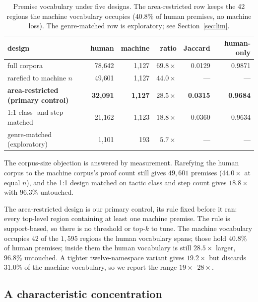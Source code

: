 \documentclass{article}
\begin{document}
\begin{table}[t]
\centering
\small
\begin{tabular}{lrrrrr}
\toprule
design & human & machine & ratio & Jaccard & human-only \\
\midrule
full corpora & 78{,}642 & 1{,}127 & $69.8\times$ & 0.0129 & 0.9871 \\
rarefied to machine $n$ & 49{,}601 & 1{,}127 & $44.0\times$ & --- & --- \\
\textbf{area-restricted (primary control)} & \textbf{32{,}091} & \textbf{1{,}127} & $\mathbf{28.5\times}$ & \textbf{0.0315} & \textbf{0.9684} \\
1:1 class- and step-matched & 21{,}162 & 1{,}123 & $18.8\times$ & 0.0360 & 0.9634 \\
genre-matched (exploratory) & 1{,}101 & 193 & $5.7\times$ & --- & --- \\
\bottomrule
\end{tabular}
\caption{Premise vocabulary under five designs. The area-restricted row keeps
the 42 regions the machine vocabulary occupies ($40.8\%$ of human premises, no
machine loss). The genre-matched row is exploratory; see
Section~\ref{sec:lim}.}
\label{tab:coverage}
\end{table}

The corpus-size objection is answered by measurement. Rarefying the human corpus
to the machine corpus's proof count still gives $49{,}601$ premises
($44.0\times$ at equal $n$), and the 1:1 design matched on tactic class and step
count gives $18.8\times$ with $96.3\%$ untouched.

The area-restricted design is our primary control, its rule fixed before it ran:
every top-level region containing at least one machine premise. The rule is
support-based, so there is no threshold or top-$k$ to tune. The machine vocabulary occupies $42$ of the
$1{,}595$ regions the human vocabulary spans; those hold $40.8\%$ of human
premises; inside them the human vocabulary is still $28.5\times$ larger, $96.8\%$
untouched. A tighter twelve-namespace variant gives $19.2\times$ but discards $31.0\%$ of
the machine vocabulary, so we report the range $19\times$--$28\times$.

\subsection{A characteristic concentration}
\end{document}

